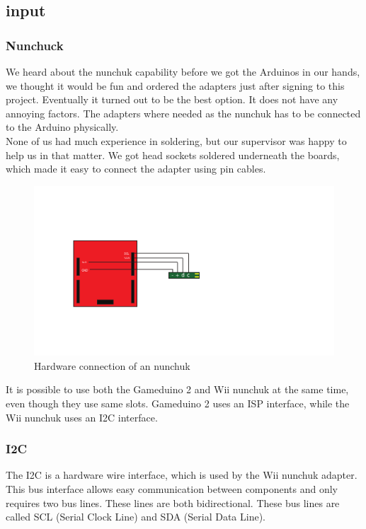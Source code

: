 \subsection{input}


\subsubsection{Nunchuck}%

We heard about the nunchuk capability before we got the Arduinos in our 
hands, we thought it would be fun and ordered the adapters just after signing
to this project. Eventually it turned out to be the best option. It does
not have any annoying factors. The adapters where needed as the nunchuk
has to be connected to the Arduino physically.
\\
None of us had much experience in soldering, but our supervisor was happy
to help us in that matter. We got head sockets soldered underneath
the boards, which made it easy to connect the adapter using pin cables.

\begin{figure}[h]
  \centering
  \includegraphics{Figures/NunchuckConnection}
  \caption{Hardware connection of an nunchuk}
  \label{fig:nunchuk_connect}
\end{figure}


It is possible to use both the Gameduino 2 and Wii
nunchuk at the same time, even though they use same slots.
Gameduino 2 uses an ISP interface, while the Wii nunchuk uses an I2C interface.


\subsubsection{I2C}
The I2C is a hardware wire interface, which is used by the Wii nunchuk adapter. This bus
interface allows easy communication between components and only requires two
bus lines. These lines are both bidirectional. These bus lines are called SCL
(Serial Clock Line) and SDA (Serial Data Line).





